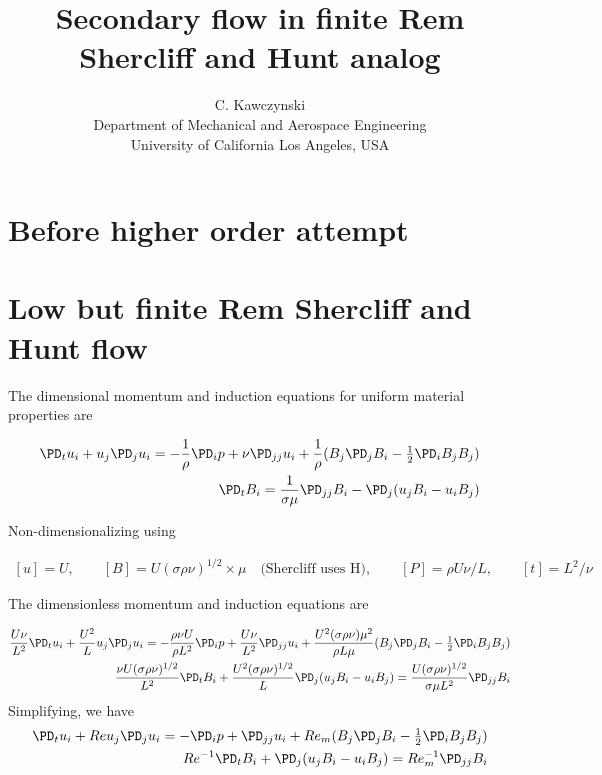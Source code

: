 \documentclass[11pt]{article}
\begin{document}
\doublespacing
\title{Secondary flow in finite Rem Shercliff and Hunt analog}
\author{C. Kawczynski \\
Department of Mechanical and Aerospace Engineering \\
University of California Los Angeles, USA\\
}
\maketitle

\section{Before higher order attempt}
\section{Low but finite Rem Shercliff and Hunt flow}
The dimensional momentum and induction equations for uniform material properties are

\begin{equation}\begin{aligned}
\PD_t u_i+u_j\PD_j u_i = -\frac{1}{\rho} \PD_i p+ \nu \PD_{jj} u_i + \frac{1}{\rho} (B_j \PD_j B_i - \tfrac{1}{2} \PD_i B_j B_j) \\
\PD_t B_i = \frac{1}{\sigma \mu} \PD_{jj} B_i - \PD_j (u_j B_i - u_i B_j)
\end{aligned} \end{equation}

Non-dimensionalizing using

\begin{equation}\begin{aligned}
	[u] = U, \qquad
	[B] = U (\sigma \rho \nu)^{1/2} \times \mu \quad \text{(Shercliff uses H)}, \qquad
	[P] = \rho U \nu / L, \qquad
	[t] = L^2 / \nu
\end{aligned} \end{equation}

The dimensionless momentum and induction equations are

\begin{equation}\begin{aligned}
\frac{U \nu}{L^2} \PD_t u_i+ \frac{U^2}{L} u_j\PD_j u_i =-\frac{\rho \nu U}{\rho L^2}\PD_i p+ \frac{U \nu}{L^2} \PD_{jj} u_i + \frac{U^2 (\sigma \rho \nu) \mu^2}{\rho L \mu} (B_j \PD_j B_i - \tfrac{1}{2} \PD_i B_j B_j) \\
\frac{\nu U (\sigma \rho \nu)^{1/2}}{L^2} \PD_t B_i + \frac{U^2 (\sigma \rho \nu)^{1/2}}{L} \PD_j (u_j B_i - u_i B_j) = \frac{U (\sigma \rho \nu)^{1/2}}{\sigma \mu L^2} \PD_{jj} B_i
\end{aligned} \end{equation}
Simplifying, we have
\begin{equation}\begin{aligned}
\PD_t u_i+ Re u_j\PD_j u_i =-\PD_i p+ \PD_{jj} u_i + Re_m (B_j \PD_j B_i - \tfrac{1}{2} \PD_i B_j B_j) \\
Re^{-1} \PD_t B_i + \PD_j (u_j B_i - u_i B_j) = Re_m^{-1} \PD_{jj} B_i
\end{aligned} \end{equation}
\end{document}
